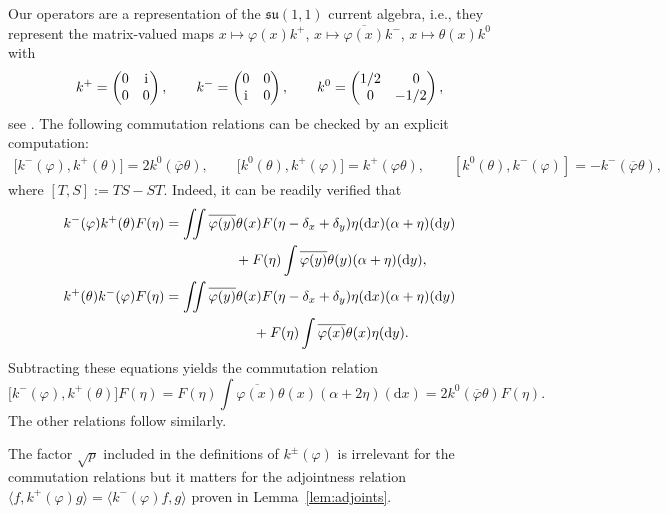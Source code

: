 \documentclass[pdftex]{sigma}
\numberwithin{equation}{section}
\newcommand{\dd}{\mathrm{d}} %
\newcommand{\la}{\langle}
\newcommand{\ra}{\rangle}
\newcommand{\1}{\mathbbm{1}}
\begin{document}
Our operators are a representation of the $\mathfrak{su}(1,1)$ current algebra, i.e., they represent the matrix-valued maps $x\mapsto \varphi(x) k^+$, $x\mapsto \overline{\varphi(x)} k^-$, $x\mapsto \theta(x) k^0$ with
\begin{align*}
 	k^+ = \begin{pmatrix} 0 & \mathrm i \\ 0 & 0 \end{pmatrix},\qquad
	k^- = \begin{pmatrix} 0 & 0 \\ \mathrm i & 0 \end{pmatrix},\qquad
	k^0 = \begin{pmatrix} 1/2 & \hphantom{-}0 \\ 0 & -1/2 \end{pmatrix},
\end{align*}
see \cite[Section~2.2]{algebraic_Floreani}.
The following commutation relations can be checked by an explicit computation:
\begin{gather*}
	\bigl[k^-(\varphi), k^+(\theta)\bigr] = 2 k^0(\overline{\varphi}\theta),\qquad
\bigl[k^0(\theta),k^+(\varphi)\bigr] = k^+(\varphi\theta),\qquad [k^0(\theta),k^-(\varphi)] = - k^-(\overline{\varphi}\theta),
\end{gather*}
where $[T, S] := TS - ST$.
Indeed, it can be readily verified that
\begin{gather*}
 k^-(\varphi) k^+(\theta) F(\eta) = \iint \overline{\varphi(y)} \theta(x) F(\eta - \delta_x + \delta_y) \eta(\dd x) (\alpha + \eta)(\dd y) \\
 \hphantom{k^-(\varphi) k^+(\theta) F(\eta) = \iint}{}
 + F(\eta) \int \overline{\varphi(y)} \theta(y) (\alpha + \eta)(\dd y), \\
 k^+(\theta) k^-(\varphi) F(\eta) = \iint \overline{\varphi(y)} \theta(x) F(\eta - \delta_x + \delta_y) \eta(\dd x) (\alpha + \eta)(\dd y) \\
 \hphantom{k^+(\theta) k^-(\varphi) F(\eta) =\iint}{}
 + F(\eta) \int \overline{\varphi(x)} \theta(x) \eta(\dd y).
\end{gather*}
Subtracting these equations yields the commutation relation
\[
\bigl[k^-(\varphi), k^+(\theta)\bigr] F(\eta) = F(\eta) \int \overline{\varphi(x)} \theta(x) (\alpha + 2\eta)(\dd x) = 2k^0(\overline{\varphi}\theta) F(\eta).
\]
 The other relations follow similarly.

The factor $\sqrt p$ included in the definitions of $k^\pm(\varphi)$ is irrelevant for the commutation relations but it matters for the adjointness relation $\la f, k^+(\varphi) g\ra = \la k^-(\varphi) f,g\ra$ proven in Lemma~\ref{lem:adjoints}.
\end{document}
